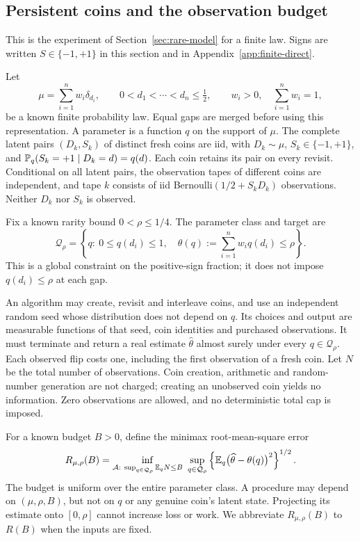\subsection{Persistent coins and the observation budget}
This is the experiment of Section~\ref{sec:rare-model} for a finite
law. Signs are written $S\in\{-1,+1\}$ in this section and in
Appendix~\ref{app:finite-direct}.

Let
\[
 \mu=\sum_{i=1}^n w_i\delta_{d_i},\qquad
 0<d_1<\cdots<d_n\le\tfrac12,\qquad
 w_i>0,\quad\sum_{i=1}^n w_i=1,
\]
be a known finite probability law. Equal gaps are merged before using
this representation. A parameter is a function $q$ on the support of
$\mu$. The complete latent pairs $(D_k,S_k)$ of distinct fresh coins
are iid, with $D_k\sim\mu$, $S_k\in\{-1,+1\}$, and
$\mathbb P_q(S_k=+1\mid D_k=d)=q(d)$. Each coin retains its pair on every
revisit. Conditional on all latent pairs, the observation tapes of
different coins are independent, and tape $k$ consists of iid
Bernoulli$(1/2+S_kD_k)$ observations. Neither $D_k$ nor $S_k$ is observed.

Fix a known rarity bound $0<\rho\le1/4$. The parameter class and target are
\begin{equation}\label{fg:eq:parameter-class}
 \mathcal Q_\rho=\left\{q:\ 0\le q(d_i)\le1,\quad
       \theta(q):=\sum_{i=1}^n w_iq(d_i)\le\rho\right\}.
\end{equation}
This is a global constraint on the positive-sign fraction; it does not
impose $q(d_i)\le\rho$ at each gap.

An algorithm may create, revisit and interleave coins, and use an
independent random seed whose distribution does not depend on $q$.
Its choices and output are measurable functions of that seed, coin
identities and purchased observations. It must terminate and return
a real estimate $\widehat\theta$ almost surely under every
$q\in\mathcal Q_\rho$. Each observed flip costs one, including the
first observation of a fresh coin. Let $N$ be the total number of
observations. Coin creation, arithmetic and random-number generation
are not charged; creating an unobserved coin yields no information.
Zero observations are allowed, and no deterministic total cap is imposed.

For a known budget $B>0$, define the minimax root-mean-square error
\begin{equation}\label{fg:eq:minimax-risk}
 R_{\mu,\rho}(B)=
 \inf_{\mathcal A:\ \sup_{q\in\mathcal Q_\rho}\mathbb E_qN\le B}
 \ \sup_{q\in\mathcal Q_\rho}
       \left\{\mathbb E_q\bigl(\widehat\theta-\theta(q)\bigr)^2\right\}^{1/2}.
\end{equation}
The budget is uniform over the entire parameter class. A procedure may
depend on $(\mu,\rho,B)$, but not on $q$ or any genuine coin's latent
state. Projecting its estimate onto $[0,\rho]$ cannot increase loss
or work. We abbreviate $R_{\mu,\rho}(B)$ to $R(B)$ when the inputs
are fixed.

